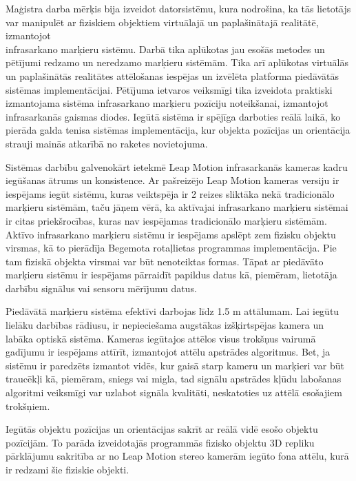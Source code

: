 \documentclass[12pt, a4paper, oneside, openright]{article}
\begin{document}
\par
Maģistra darba mērķis bija izveidot datorsistēmu, kura nodrošina, ka tās lietotājs
var manipulēt ar fiziskiem objektiem virtuālajā un paplašinātajā realitātē,
izmantojot \\ infrasarkano marķieru sistēmu. Darbā tika aplūkotas jau esošās metodes un
pētījumi redzamo un neredzamo marķieru sistēmām. Tika arī aplūkotas virtuālās
un paplašinātās realitātes attēlošanas iespējas un izvēlēta platforma piedāvātās
sistēmas implementācijai. Pētījuma ietvaros veiksmīgi tika izveidota praktiski izmantojama
sistēma infrasarkano marķieru pozīciju noteikšanai, izmantojot infrasarkanās gaismas
diodes. Iegūtā sistēma ir spējīga darboties reālā laikā, ko pierāda galda tenisa 
sistēmas implementācija, kur objekta pozīcijas un orientācija strauji mainās atkarībā
no raketes novietojuma.
\par
Sistēmas darbību galvenokārt ietekmē Leap Motion infrasarkanās kameras kadru \\ iegūšanas ātrums
un konsistence. Ar pašreizējo Leap Motion kameras versiju ir iespējams iegūt sistēmu, kuras
veiktspēja ir 2 reizes sliktāka nekā tradicionālo marķieru sistēmām, taču jāņem vērā, ka
aktīvajai infrasarkano marķieru sistēmai ir citas priekšrocības, kuras nav iespējamas
tradicionālo marķieru sistēmām. Aktīvo infrasarkano marķieru sistēmu ir iespējams apslēpt
zem fizisku objektu virsmas, kā to pierādīja Begemota rotaļlietas programmas implementācija.
Pie tam fiziskā objekta virsmai var būt nenoteiktas formas. Tāpat ar piedāvāto marķieru
sistēmu ir iespējams pārraidīt papildus datus kā, piemēram, lietotāja darbību signālus
vai sensoru mērījumu datus.
\par
Piedāvātā marķieru sistēma efektīvi darbojas līdz 1.5 m attālumam. Lai iegūtu lielāku
darbības rādiusu, ir nepieciešama augstākas izšķirtspējas kamera un labāka optiskā sistēma.
Kameras iegūtajos attēlos visus trokšņus vairumā gadījumu ir iespējams attīrīt, izmantojot
attēlu apstrādes algoritmus. Bet, ja sistēmu ir paredzēts izmantot vidēs, kur gaisā starp
kameru un marķieri var būt traucēkļi kā, piemēram, sniegs vai migla, tad signālu apstrādes
kļūdu labošanas algoritmi veiksmīgi var uzlabot signāla kvalitāti, neskatoties uz attēlā
esošajiem trokšņiem. 
\par
Iegūtās objektu pozīcijas un orientācijas sakrīt ar reālā vidē esošo objektu pozīcijām.
To parāda izveidotajās programmās fizisko objektu 3D repliku pārklājumu sakritība ar 
no Leap Motion stereo kamerām iegūto fona attēlu, kurā ir redzami šie fiziskie objekti.
\end{document}
